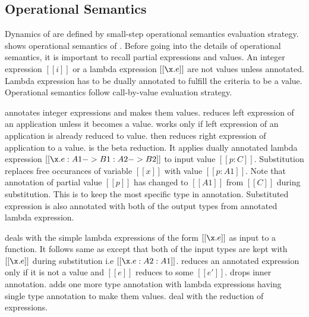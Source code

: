 \begin{comment}
\begin{figure}[t]
  \begin{small}
    \centering
    \drules[typ]{$ [[G |- e dirflag A]] $}{Bidirectional Typing}{int, var, ann, app, sub, abs, typeof}
  \end{small}
  \caption{Typing for \cal.}
  \label{fig:union:typ}
\end{figure}
\end{comment}

\subsection{Operational Semantics}
\label{sec:union:os}
Dynamics of \cal are defined by small-step operational semantics evaluation strategy. 
 shows
operational semantics of \cal. Before going into the details of operational semantics, it is important
to recall partial expressions and values. An integer expression $[[i]]$ or a lambda expression $[[\x.e]]$
are not values unless annotated. Lambda expression has to be dually annotated to fulfill the criteria to
be a value. Operational semantics follow call-by-value evaluation strategy.

 annotates integer expressions and makes them values.  reduces left expression
of an application unless it becomes a value.  works only if left expression of an
application is already reduced to value.  then reduces right expression of
application to a value.
 is the beta reduction. It applies dually annotated lambda expression 
$[[\x.e : A1 -> B1 : A2 -> B2]]$ to input value $[[p:C]]$. Substitution replaces free occurances of variable
$[[x]]$ with value $[[p:A1]]$. Note that annotation of partial value $[[p]]$ has changed to $[[A1]]$ from 
$[[C]]$ during substitution.
This is to keep the most specific type in annotation. Substituted expression is also
annotated with both of the output types from annotated lambda expression. 

 deals with the simple lambda expressions of the form $[[\x.e]]$ as input to a function.
It follows same as  except that both of the input types are kept with $[[\x.e]]$ during
substitution i.e $[[\x.e:A2:A1]]$.  reduces an annotated expression only if it is not a value
and $[[e]]$ reduces to some $[[e']]$.  drops inner annotation.  adds one
more type annotation with lambda expressions having single type annotation to make them values.
 deal with the reduction of \typeof expressions.

